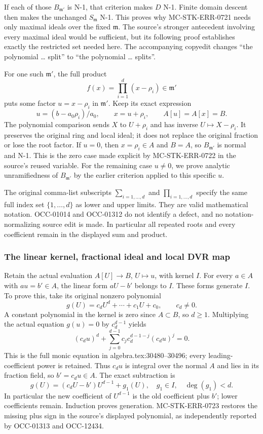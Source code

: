 If each of those \(B_{\mathfrak m'}\) is N-1, that criterion makes \(D\) N-1. Finite domain descent then makes the unchanged \(S_{\mathfrak m}\) N-1. This proves why MC-STK-ERR-0721 needs only maximal ideals over the fixed \(\mathfrak m\). The source's stronger antecedent involving every maximal ideal would be sufficient, but its following proof establishes exactly the restricted set needed here. The accompanying copyedit changes ``the polynomial \ldots{} split'' to ``the polynomial \ldots{} splits''.

For one such \(\mathfrak m'\), the full product \[
 f(x)=\prod_{i=1}^{d}(x-\rho_i)\in\mathfrak m'
\] puts some factor \(u=x-\rho_i\) in \(\mathfrak m'\). Keep its exact expression \[
 u=(b-a_0\rho_i)/a_0,\qquad x=u+\rho_i,
 \qquad A[u]=A[x]=B.
\] The polynomial comparison sends \(X\) to \(U+\rho_i\) and has inverse \(U\mapsto X-\rho_i\). It preserves the original ring and local ideal; it does not replace the original fraction or lose the root factor. If \(u=0\), then \(x=\rho_i\in A\) and \(B=A\), so \(B_{\mathfrak m'}\) is normal and N-1. This is the zero case made explicit by MC-STK-ERR-0722 in the source's reused variable. For the remaining case \(u\ne0\), we prove analytic unramifiedness of \(B_{\mathfrak m'}\) by the earlier criterion applied to this specific \(u\).

The original comma-list subscripts \(\sum_{i=1,\ldots,d}\) and \(\prod_{i=1,\ldots,d}\) specify the same full index set \(\{1,\ldots,d\}\) as lower and upper limits. They are valid mathematical notation. OCC-01014 and OCC-01312 do not identify a defect, and no notation-normalizing source edit is made. In particular all repeated roots and every coefficient remain in the displayed sum and product.

\subsubsection{The linear kernel, fractional ideal and local DVR map}\label{algebra-proof-067-the-linear-kernel-fractional-ideal-and-local-dvr-map}

Retain the actual evaluation \(A[U]\to B\), \(U\mapsto u\), with kernel \(I\). For every \(a\in A\) with \(au=b'\in A\), the linear form \(aU-b'\) belongs to \(I\). These forms generate \(I\). To prove this, take its original nonzero polynomial \[
 g(U)=c_dU^d+\cdots+c_1U+c_0,\qquad c_d\ne0.
\] A constant polynomial in the kernel is zero since \(A\subset B\), so \(d\geq1\). Multiplying the actual equation \(g(u)=0\) by \(c_d^{d-1}\) yields \[
 (c_du)^d+\sum_{j=0}^{d-1}c_jc_d^{d-1-j}(c_du)^j=0.
\] This is the full monic equation in algebra.tex:30480--30496; every leading-coefficient power is retained. Thus \(c_du\) is integral over the normal \(A\) and lies in its fraction field, so \(b'=c_du\in A\). The exact subtraction is \[
 g(U)=(c_dU-b')U^{d-1}+g_1(U),
 \quad g_1\in I,\quad\deg(g_1)<d.
\] In particular the new coefficient of \(U^{d-1}\) is the old coefficient plus \(b'\); lower coefficients remain. Induction proves generation. MC-STK-ERR-0723 restores the missing plus sign in the source's displayed polynomial, as independently reported by OCC-01313 and OCC-12434.

